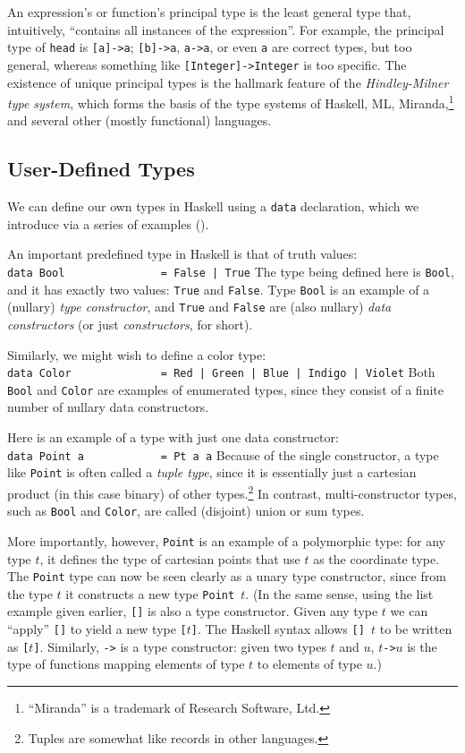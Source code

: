 An expression's or function's principal type is the least general type
that, intuitively, ``contains all instances of the expression''.  For
example, the principal type of \mbox{\tt head} is \mbox{\tt [a]->a}; \mbox{\tt [b]->a},
\mbox{\tt a->a}, or even \mbox{\tt a} are correct types, but too general, whereas something
like \mbox{\tt [Integer]->Integer} is too specific.  The existence of unique principal
types is the hallmark feature of the {\em Hindley-Milner type system},
which forms the basis of the type systems of Haskell, ML,
Miranda,\footnote{``Miranda'' is a trademark of Research Software,
Ltd.} and several other (mostly functional) languages.

\subsection{User-Defined Types}
\label{tut-user-types}

We can define our own types in Haskell using a \mbox{\tt data} declaration,
which we introduce via a series of examples ().

An important predefined type in Haskell is that of truth values:
\bprog
\mbox{\tt data\ Bool\ \ \ \ \ \ \ \ \ \ \ \ \ \ \ =\ False\ |\ True}
\eprog
The type being defined here is \mbox{\tt Bool}, and it has exactly two values:
\mbox{\tt True} and \mbox{\tt False}.  Type \mbox{\tt Bool} is an example of a (nullary) {\em type
constructor}, and \mbox{\tt True} and \mbox{\tt False} are (also nullary) {\em data
constructors} (or just {\em constructors}, for short).

Similarly, we might wish to define a color type:
\bprog
\mbox{\tt data\ Color\ \ \ \ \ \ \ \ \ \ \ \ \ \ =\ Red\ |\ Green\ |\ Blue\ |\ Indigo\ |\ Violet}
\eprog
Both \mbox{\tt Bool} and \mbox{\tt Color} are examples of enumerated types, since
they consist of a finite number of nullary data constructors.

Here is an example of a type with just one data constructor:
\bprog
\mbox{\tt data\ Point\ a\ \ \ \ \ \ \ \ \ \ \ \ =\ Pt\ a\ a}
\eprog
Because of the single constructor, a type like \mbox{\tt Point} is often
called a {\em tuple type}, since it is essentially just a cartesian
product (in this case binary) of other types.\footnote{Tuples are
somewhat like records in other languages.}
In contrast, multi-constructor types, such as \mbox{\tt Bool} and
\mbox{\tt Color}, are called (disjoint) union or sum types.

More importantly, however, \mbox{\tt Point} is an example of a 
polymorphic type: for any type $t$, it defines the type of cartesian
points that use $t$ as the coordinate type.  The \mbox{\tt Point} type can now be seen
clearly as a unary type constructor, since from the type $t$ it
constructs a new type \mbox{\tt Point\ }$t$.  (In the same sense, using the list
example given earlier, \mbox{\tt []} is also a type constructor.  Given any type $t$
we can ``apply'' \mbox{\tt []} to yield a new type \mbox{\tt [}$t$\mbox{\tt ]}.  The Haskell
syntax allows \mbox{\tt []\ }$t$ to be written as \mbox{\tt [}$t$\mbox{\tt ]}.  Similarly,
\mbox{\tt ->} is a type constructor: given two types $t$ and $u$,
$t$\mbox{\tt ->}$u$ is the type of functions mapping elements of type $t$ to
elements of type $u$.)

